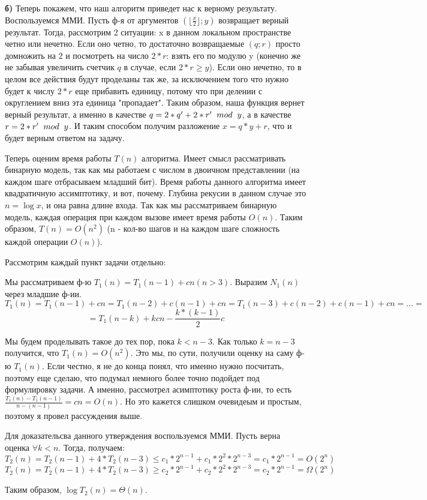 \documentclass[12pt]{extreport}
\theoremstyle{definition}
\theoremstyle{definition}
\let\leq\leqslant
\let\geq\geqslant
\newcounter{problem}
\newcounter{subproblem}
\def\PRSUBskip{
	\medskip
}
\def\prsub{\PRSUBskip\noindent\stepcounter{subproblem}{\sf \thesubproblem .} }
\begin{document}
\textbf{б)} Теперь покажем, что наш алгоритм приведет нас к верному результату. Воспользуемся ММИ. Пусть ф-я от аргументов $(\lfloor \frac{x}{2} \rfloor ; y)$ возвращает верный результат. Тогда, рассмотрим 2 ситуации: x в данном локальном пространстве четно или нечетно. Если оно четно, то достаточно возвращаемые $(q;r)$ просто домножить на 2 и посмотреть на число $2*r$: взять его по модулю y (конечно же не забывая увеличить счетчик $q$ в случае, если $2*r \geq y$). Если оно нечетно, то в целом все действия будут проделаны так же, за исключением того что нужно будет к числу $2*r$ еще прибавить единицу, потому что при делении с округлением вниз эта единица "пропадает". Таким образом, наша функция вернет верный результат, а именно в качестве $q = 2*q' + 2*r' \hspace{2mm} mod \hspace{2mm} y$, а в качестве $r = 2*r' \hspace{2mm} mod \hspace{2mm} y$. И таким способом получим разложение $x = q*y + r$, что и будет верным ответом на задачу.

\prsub Теперь оценим время работы $T(n)$ алгоритма. Имеет смысл рассматривать бинарную модель, так как мы работаем с числом в двоичном представлении (на каждом шаге отбрасываем младший бит). Время работы данного алгоритма имеет квадратичную ассимптотику, и вот, почему. Глубина рекусии в данном случае это $n = \log x$, и она равна длине входа. Так как мы рассматриваем бинарную модель, каждая операция при каждом вызове имеет время работы $O(n)$. Таким образом, $T(n) = O(n^2)$ (n - кол-во шагов и на каждом шаге сложность каждой операции $O(n)$).

\Pr \hspace{1mm} Рассмотрим каждый пункт задачи отдельно:

\prsub Мы рассматриваем ф-ю $T_1(n) = T_1(n-1) + cn (n>3)$. Выразим $N_1(n)$ через младшие ф-ии. $$T_1(n) = T_1(n-1) + cn = T_1(n-2) + c(n-1) + cn = T_1(n-3) + c(n-2) + c(n-1) + cn = ... = $$
$$ = T_1(n-k) + kcn - \frac{k*(k-1)}{2} c$$

Мы будем проделывать такое до тех пор, пока $k < n-3$. Как только $k = n-3$ получится, что $T_1(n) = O(n^2)$. Это мы, по сути, получили оценку на саму ф-ю $T_1(n)$. Если честно, я не до конца понял, что именно нужно посчитать, поэтому еще сделаю, что подумал немного более точно подойдет под формулировку задачи. А именно, рассмотрел асимптотику роста ф-ии, то есть $\frac{T_1(n) - T_1(n-1)}{n - (n-1)} = cn = O(n).$ Но это кажется слишком очевидеым и простым, поэтому я провел рассуждения выше.

\prsub Для доказательсва данного утверждения воспользуемся ММИ. Пусть верна оценка $\forall k < n$. Тогда, получаем: $$T_2(n) = T_2(n-1) + 4*T_2(n-3) \leq c_1*2^{n-1} + c_1*2^2*2^{n-3} = c_1*2^{n-1} = O(2^n)$$ $$T_2(n) = T_2(n-1) + 4*T_2(n-3) \geq c_2*2^{n-1} + c_2*2^2*2^{n-3} = c_2*2^{n-1} = \Omega(2^n)$$

Таким образом, $\log T_2(n) = \Theta (n)$. 
\end{document}
